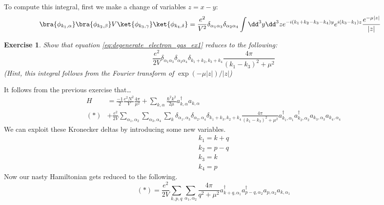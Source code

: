 \documentclass{article}
\newtheorem{exercise}{Exercise}[section]
\begin{document}
To compute this integral, first we make a change of variables $z = x-y$:
\begin{align}\bra{\phi_{k_1,\alpha}}\bra{\phi_{k_2,\beta}}V\ket{\phi_{k_3,\gamma}}\ket{\phi_{k_4,\delta}} &= \frac{e^2}{V^2}\delta_{\alpha_1 \alpha_3}\delta_{\alpha_2\alpha_4}\int \dd^3 y \dd^3 z e^{-i(k_1+k_2-k_3-k_4)y}e^{i(k_3-k_1)z}\frac{e^{-\mu|z|}}{|z|}
\label{eq:degenerate_electron_gas_ex1}
\end{align}
\begin{exercise}
Show that equation \eqref{eq:degenerate_electron_gas_ex1} reduces to the following:
\[\frac{e^2}{2V}\delta_{\alpha_1 \alpha_3}\delta_{\alpha_2\alpha_4}\delta_{k_1+k_2,k_3+k_4}\frac{4\pi}{(k_1-k_3)^2+\mu^2}\]
(Hint, this integral follows from the Fourier transform of $\exp(-\mu|z|)/|z|$)
\end{exercise}
It follows from the previous exercise that\dots
\begin{align}
    H&=\frac{-1}{2}\frac{e^2 N^2}{V}\frac{4\pi}{\mu^2} +
    \sum_{k,\alpha}\frac{\hbar^2 k^2}{2\mu}a_{k,\alpha}^\dagger a_{k,\alpha} \\ (\ast) & + \frac{e^2}{2V}\sum_{\alpha_1,\alpha_2}\sum_{\alpha_3,\alpha_4}\sum_k \delta_{\alpha_1,\alpha_3}\delta_{\alpha_2,\alpha_4}\delta_{k_1+k_3,k_2+k_4}\frac{4\pi}{(k_1-k_3)^2+\mu^2}a_{k_1,\alpha_1}^\dagger a_{k_2,\alpha_2}^\dagger a_{k_3,\alpha_3}a_{k_4,\alpha_4}
\end{align}
We can exploit these Kronecker deltas by introducing some new variables.
\begin{align*}
k_1=k+q\\
k_2=p-q\\
k_3=k\\
k_4=p
\end{align*}
Now our nasty Hamiltonian gets reduced to the following.
\[(\ast) = \frac{e^2}{2V}\sum_{k,p,q}\sum_{\alpha_1,\alpha_2}\frac{4\pi}{q^2+\mu^2}a_{k+q,\alpha_1}^\dagger a_{p-q,\alpha_2}^\dagger a_{p,\alpha_2}a_{k,\alpha_1}\]
\end{document}
